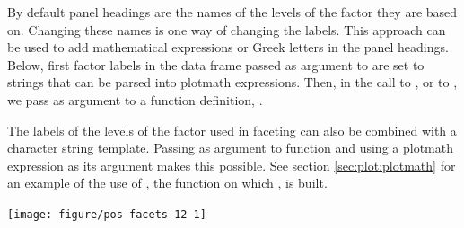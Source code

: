 \documentclass[krantz2]{krantz}\usepackage{knitr}
\begin{document}
\begin{explainbox}
By default panel headings are the names of the levels of the factor they are based on. Changing these names is one way of changing the labels. This approach can be used to add mathematical expressions or Greek letters in the panel headings. Below, first factor labels in the data frame passed as argument to  are set to strings that can be parsed into plotmath expressions. Then, in the call to , or to , we pass as argument to  a function definition, .

\begin{knitrout}\footnotesize
{}\color{fgcolor}\begin{kframe}
\begin{alltt}
\hlopt{$} \hlkwb{<-} \hlopt{$}
                        \hlstd{=} \hlstd{(}\hlstd{,} \hlstd{,} \hlstd{))}
\hlstd{(} 
        \hlstd{=}  \hlopt{+}
  \hlstd{()} \hlopt{+}
  \hlstd{(} \hlstd{=}   
\end{alltt}
\end{kframe}
\end{knitrout}

The labels of the levels of the factor used in faceting can also be combined with a character string template. Passing as argument to  function  and using a plotmath expression as its argument makes this possible. See section \ref{sec:plot:plotmath} for an example of the use of , the \Rlang function on which , is built.

\begin{knitrout}\footnotesize
{}\color{fgcolor}\begin{kframe}
\begin{alltt}
 \hlopt{+}
  \hlstd{(} \hlstd{=} 
              \hlstd{=} \hlstd{(} \hlstd{=} \hlopt{~}\hlstd{))}
\end{alltt}
\end{kframe}

{\centering \texttt{[image: figure/pos-facets-12-1]} 

}


\end{knitrout}
\end{explainbox}
\end{document}
